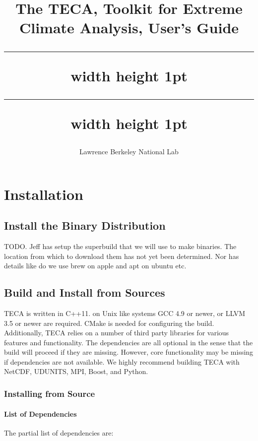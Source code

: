 \documentclass[a4paper,10pt,DIV=12]{scrreprt}
\title{%
The TECA, Toolkit for Extreme Climate Analysis, User's Guide \\ \vspace{3mm} %
\hrule width \hsize height 1pt \vspace{0.51mm} %
\hrule width \hsize height 1pt}
\subtitle{Lawrence Berkeley National Lab}
\author{}
\begin{document}
\maketitle


\tableofcontents

\chapter{Installation}
\section{Install the Binary Distribution}
TODO. Jeff has setup the superbuild that we will use to make binaries. The location
from which to download them has not yet been determined. Nor has details like do we use
brew on apple and apt on ubuntu etc.

\section{Build and Install from Sources}
\label{sec:build}
TECA is written in C++11. on Unix like systems
GCC 4.9 or newer, or LLVM 3.5 or newer are required. CMake is needed for configuring the build.
Additionally, TECA relies on a number of third party libraries for various
features and functionality. The dependencies are all optional in the sense
that the build will proceed if they are missing. However, core functionality
may be missing if dependencies are not available. We highly recommend building
TECA with NetCDF, UDUNITS, MPI, Boost, and Python.

\subsection{Installing from Source}
\subsubsection{List of Dependencies}
The partial list of dependencies are:
\end{document}
